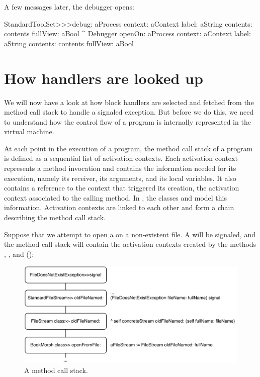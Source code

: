 \documentclass[a4paper,10pt,twoside]{book}
\begin{document}
A few messages later, the debugger opens:

\begin{code}{}
StandardToolSet>>>debug: aProcess context: aContext label: aString contents: contents fullView: aBool
	^ Debugger openOn: aProcess context: aContext label: aString contents: contents fullView: aBool
\end{code}

\section{How handlers are looked up}

We will now have a look at how block handlers are selected and fetched from the method call stack to handle a signaled exception. But before we do this, we need to understand how the control flow of a program is internally represented in the virtual machine.

At each point in the execution of a program, the method call stack of a program is defined as a sequential list of activation contexts. Each activation context represents a method invocation and contains the information needed for its execution, namely its receiver, its arguments, and its local variables. It also contains a reference to the context that triggered its creation, \ie the activation context associated to the calling method. In \pharo, the classes  and  model this information. Activation contexts are linked to each other and form a chain describing the method call stack.

Suppose that we attempt to open a  on a non-existent file.
A  will be signaled, and the method call stack will contain the activation contexts created by the methods , , and  ():

\begin{figure}[ht]\centering
        \includegraphics[width=.9\linewidth]{Stack}
        \caption{A \pharo method call stack.}
\end{figure}
\end{document}
